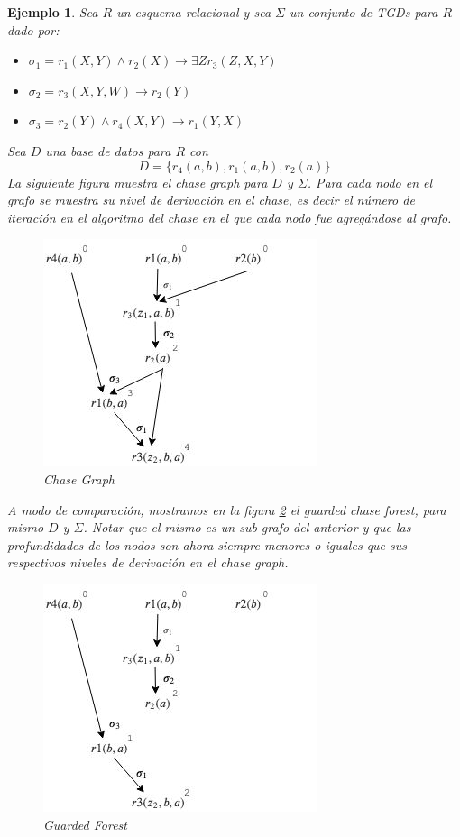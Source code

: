 \documentclass[11pt,a4paper,twoside]{tesis}
\newtheorem{exmp}{Ejemplo}
\begin{document}
\begin{exmp}\label{ejemplo_chase_forest}
    Sea $R$ un esquema relacional y sea $\Sigma$ un conjunto de TGDs para $R$ dado por:
    \begin{itemize}
        \item $\sigma_1 = r_1(X, Y) \land r_2(X) \rightarrow \exists Z r_3(Z, X, Y)$
        \item $\sigma_2 = r_3(X, Y, W) \rightarrow r_2(Y)$
        \item $\sigma_3 = r_2(Y) \land r_4(X, Y) \rightarrow r_1(Y, X)$
    \end{itemize}

Sea $D$ una base de datos para $R$ con $$D=\{r_4(a, b), r_1(a, b), r_2(a)\}$$
La siguiente figura muestra el \textit{chase graph} para $D$ y $\Sigma$. Para cada nodo en el grafo se muestra su \textit{nivel de derivación} en el chase, es decir el número de iteración en el algoritmo del chase en el que cada nodo fue agregándose al grafo.  
    
\begin{figure}[ht]
    \includegraphics[scale=0.5]{chase_graph}
    \centering
    \caption{Chase Graph}
    \label{fig:chase_graph}
\end{figure}

A modo de comparación, mostramos en la figura \ref{fig:guarded_forest} el \textit{guarded chase forest}, para mismo $D$ y $\Sigma$. Notar que el mismo es un sub-grafo del anterior y que las profundidades de los nodos son ahora siempre menores o iguales que sus respectivos niveles de \textit{derivación} en el  \textit{chase graph}. 

\begin{figure}[ht]
    \includegraphics[scale=0.5]{guarded_chase_forest}
    \centering
    \caption{Guarded Forest}
    \label{fig:guarded_forest}
\end{figure}

\end{exmp}
\end{document}
